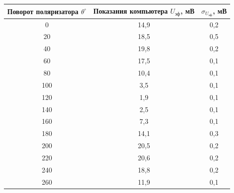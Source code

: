 \documentclass[a4paper,12pt]{article} %
\begin{document}
	\begin{table}[h!]
		\centering
		\begin{tabular}{|c|c|c|}
			\hline
			Поворот поляризатора $\theta ^\circ$ & Показания компьютера $U_{\text{эф}}$, мВ & $\sigma_{U_{\text{эф}}}$, мВ \\ \hline
			0                                          & 14,9                                     & 0,2                         \\ \hline
			20                                         & 18,5                                     & 0,5                         \\ \hline
			40                                         & 19,8                                     & 0,2                         \\ \hline
			60                                         & 17,5                                     & 0,1                         \\ \hline
			80                                         & 10,4                                     & 0,1                         \\ \hline
			100                                        & 3,5                                      & 0,1                         \\ \hline
			120                                        & 1,9                                      & 0,1                         \\ \hline
			140                                        & 2,5                                      & 0,1                         \\ \hline
			160                                        & 7,3                                      & 0,1                         \\ \hline
			180                                        & 14,1                                     & 0,3                         \\ \hline
			200                                        & 20,5                                     & 0,2                         \\ \hline
			220                                        & 20,6                                     & 0,2                         \\ \hline
			240                                        & 18,8                                     & 0,2                         \\ \hline
			260                                        & 11,9                                     & 0,1                         \\ \hline

\end{tabular}
\end{table}
\end{document}
